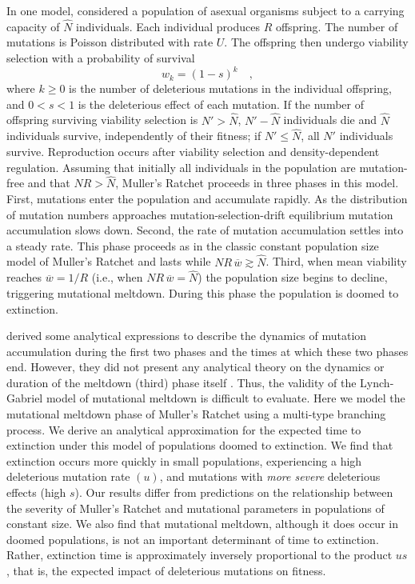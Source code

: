 \documentclass[9pt,lineno]{elife}
\begin{document}
In one model, \citet{lyn93} considered a population of asexual organisms subject to a carrying capacity of $\widehat N$ individuals.  Each individual produces $R$ offspring.  The number of mutations is Poisson distributed with rate $U$.  The offspring then undergo viability selection with a probability of survival
%
\begin{equation}
  w_k=(1-s)^{k} \quad ,
  \label{eq:fit}
\end{equation}
%
where
$k \geq 0$ is the number of deleterious mutations in the individual offspring,  
and $0 < s < 1$ is the deleterious effect of each mutation. 
If the number of offspring surviving viability selection is $N' > \widehat N$, $N' - \widehat N$ individuals die and $\widehat N$ individuals survive, independently of their fitness; if $N' \leq \widehat N$, all $N'$ individuals survive.  
Reproduction occurs after viability selection and density-dependent regulation.  Assuming that initially all individuals in the population are mutation-free and that $N R > \widehat N$, Muller's Ratchet proceeds in three phases in this model.  
First, mutations enter the population and accumulate rapidly.  As the distribution of mutation numbers approaches mutation-selection-drift equilibrium mutation accumulation slows down.
Second, the rate of mutation accumulation settles into a steady rate.  This phase proceeds as in the classic constant population size model of Muller's Ratchet \citep{Haigh_The_1978} and lasts while $N R \, \overline w \gtrsim \widehat N$.
Third, when mean viability reaches $\overline w = 1/R$ (i.e., when $N R \, \overline w = \widehat N$) the population size begins to decline, triggering mutational meltdown.  During this phase the population is doomed to extinction.


\citet{lyn93} derived some analytical expressions to describe the dynamics of mutation accumulation during the first two phases and the times at which these two phases end.  
However, they did not present any analytical theory on the dynamics or duration of the meltdown (third) phase itself \citep[see also][]{Gabriel_MULLER_1993, lyn95}.
Thus, the validity of the Lynch-Gabriel model of mutational meltdown is difficult to evaluate.
Here we model the mutational meltdown phase of Muller's Ratchet using a multi-type branching process.
We derive an analytical approximation for the expected time to extinction under this model
of populations doomed to extinction.  
We find that extinction occurs more quickly in small populations, 
experiencing a high deleterious mutation rate $(u)$, 
and mutations with \emph{more severe} deleterious effects (high $s$).  
Our results differ from predictions on the relationship between the severity of Muller's Ratchet and mutational parameters in populations of constant size.
We also find that mutational meltdown, 
although it does occur in doomed populations,
is not an important determinant of time to extinction. 
Rather, extinction time is approximately inversely proportional to the product $us$, that is, 
the expected impact of deleterious mutations on fitness.
\end{document}
